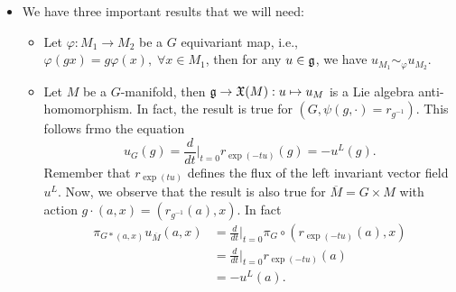 \begin{itemize}
\begin{example}
        \begin{equation}
            \begin{split}
                u_{\fr{g}}(v)&=\frac{d}{dt}\bigg|_{t=0}\Ad_{\exp(tu)}(v)\\
                &=\frac{d}{dt}\bigg|_{t=0}(r_{\exp(-tu)}\circ \ell_{\exp(tu)})_{*,e}(v)\\
                &=\frac{d}{dt}\bigg|_{t=0}d_{\exp(tu)}r_{\exp(-tu)}(v^L(\exp(tu)))\\
                &=\frac{d}{dt}\bigg|_{t=0} r_{\exp(tu)*}(v^L)\big|_e\\
                &=\mathcal{L}_{u^L}(v^L)\big|_e\\
                &=[u^L,v^L]_e\\
                &=[u,v].
            \end{split}
        \end{equation}
        Therefore $\Ad_{*,e}=\ad$.
    \end{example}
    \item We have three important results that we will need: 
        \begin{itemize}
            \item[1.] Let $\varphi:M_1\to M_2$ be a $G$ equivariant map, i.e., $\varphi(gx)=g\varphi(x),\;\forall x\in M_1$, then 
            for any $u\in\mathfrak{g}$, we have $u_{M_1}\sim_\varphi u_{M_2}$.
            \item[2.] Let $M$ be a $G$-manifold, then $\mathfrak{g}\to\mathfrak{X}(M):u\mapsto u_M$ is a Lie algebra anti-homomorphism. 
            In fact, the result is true for $(G,\psi(g,\cdot)=r_{g^{-1}})$. This follows frmo the equation 
            \begin{equation}
                u_G(g)=\frac{d}{dt}\bigg|_{t=0}r_{\exp(-tu)}(g)=-u^L(g).
            \end{equation}
            Remember that $r_{\exp(tu)}$ defines the flux of the left invariant vector field $u^L$. Now, we observe that 
            the result is also true for $\overline{M}=G\times M$ with action $g\cdot(a,x)=(r_{g^{-1}}(a),x)$. In fact 
            \begin{equation}
                \begin{split}
                    \pi_{G*(a,x)}u_{\overline{M}}(a,x)&=\frac{d}{dt}\bigg|_{t=0}\pi_G\circ(r_{\exp(-tu)}(a),x)\\
                    &=\frac{d}{dt}\bigg|_{t=0}r_{\exp(-tu)}(a)\\
                    &=-u^L(a).
                \end{split}

\end{equation}
\end{itemize}
\end{itemize}
